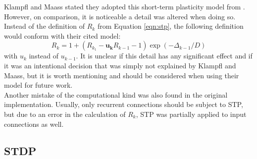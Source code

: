 Klampfl and Maass stated they adopted this short-term plasticity model from \parencite{markram_wang_tsodyks_1998}. However, on comparison, it is noticeable a detail was altered when doing so. Instead of the definition of $R_k$ from Equation \ref{eqn:stp}, the following definition  would conform with their cited model:
\begin{equation*}
    R_k = 1 + (R_{k_1} - \mathbf{u_{k}}R_{k-1}-1)\exp(-\Delta_{k-1}/D)
\end{equation*}
with $u_k$ instead of $u_{k-1}$. It is unclear if this detail has any significant effect and if it was an intentional decision that was simply not explained by Klampfl and Maass, but it is worth mentioning and should be considered when using their model for future work.\\
Another mistake of the computational kind was also found in the original implementation. Usually, only recurrent connections should be subject to STP, but due to an error in the calculation of $R_k$, STP was partially applied to input connections as well.


\subsection{STDP} \label{ssec:stdp}


